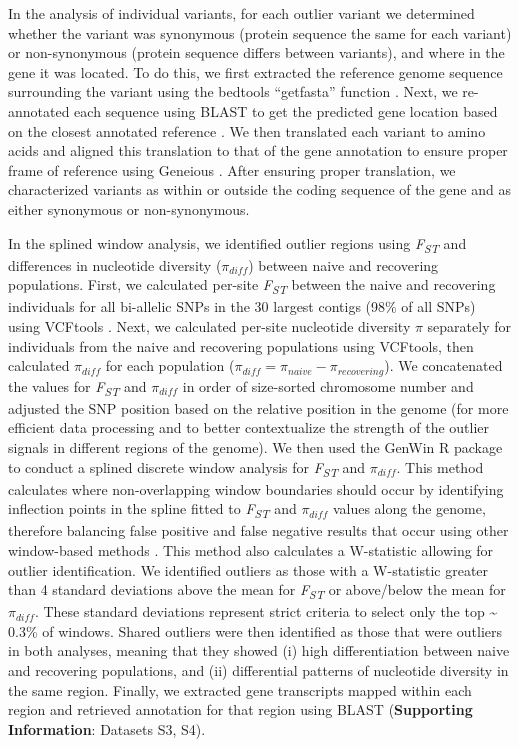\documentclass[9pt,twocolumn,twoside,lineno]{pnas-new}
\begin{document}
{In the analysis of individual variants, for each outlier variant we
determined whether the variant was synonymous (protein sequence the same
for each variant) or non-synonymous (protein sequence differs between
variants), and where in the gene it was located. To do this, we first
extracted the reference genome sequence surrounding the variant using
the bedtools ``getfasta'' function \citep{quinlan2010}. Next, we
re-annotated each sequence using BLAST to get the predicted gene
location based on the closest annotated reference \citep{altschul1997}.
We then translated each variant to amino acids and aligned this
translation to that of the gene annotation to ensure proper frame of
reference using Geneious \citep{kearse2012}. After ensuring proper
translation, we characterized variants as within or outside the coding
sequence of the gene and as either synonymous or non-synonymous.

In the splined window analysis, we identified outlier regions using
\emph{F\textsubscript{ST}} and differences in nucleotide diversity
(\(\pi_{diff}\)) between naive and recovering populations. First, we
calculated per-site \emph{F\textsubscript{ST}} between the naive and
recovering individuals for all bi-allelic SNPs in the 30 largest contigs
(98\% of all SNPs) using VCFtools \citep{danecek2011}. Next, we
calculated per-site nucleotide diversity \(\pi\) separately for
individuals from the naive and recovering populations using VCFtools,
then calculated \(\pi_{diff}\) for each population
(\(\pi_{diff} = \pi_{naive} - \pi_{recovering}\)). We concatenated the
values for \emph{F\textsubscript{ST}} and \(\pi_{diff}\) in order of
size-sorted chromosome number and adjusted the SNP position based on the
relative position in the genome (for more efficient data processing and
to better contextualize the strength of the outlier signals in different
regions of the genome). We then used the GenWin R package
\citep{beissinger2015} to conduct a splined discrete window analysis for
\emph{F\textsubscript{ST}} and \(\pi_{diff}\). This method calculates
where non-overlapping window boundaries should occur by identifying
inflection points in the spline fitted to \emph{F\textsubscript{ST}} and
\(\pi_{diff}\) values along the genome, therefore balancing false
positive and false negative results that occur using other window-based
methods \citep{beissinger2015}. This method also calculates a
W-statistic allowing for outlier identification. We identified outliers
as those with a W-statistic greater than 4 standard deviations above the
mean for \emph{F\textsubscript{ST}} or above/below the mean for
\(\pi_{diff}\). These standard deviations represent strict criteria to
select only the top \textasciitilde{} 0.3\% of windows. Shared outliers
were then identified as those that were outliers in both analyses,
meaning that they showed (i) high differentiation between naive and
recovering populations, and (ii) differential patterns of nucleotide
diversity in the same region. Finally, we extracted gene transcripts
mapped within each region and retrieved annotation for that region using
BLAST (\textbf{Supporting Information}: Datasets S3, S4).

}
\end{document}
